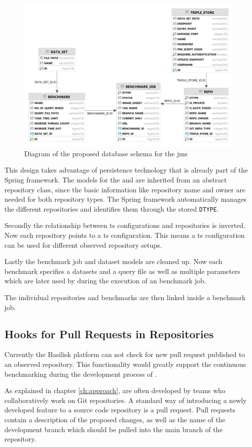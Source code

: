 \begin{figure}[tbph]
	\centering
	\includegraphics[width=.75\textwidth]{figures/jms_db_schema_design.png}
	\caption{Diagram of the proposed database schema for the \ac{jms}}
	\label{fig:design_jms_db_schema}
\end{figure}

This design takes advantage of persistence technology that is already part of the Spring framework.
The models for the \gh{} and \dockh{} are inherited from an abstract repository class, since the basic information like repository name and owner are needed for both repository types.
The Spring framework automatically manages the different repositories and identifies them through the stored \texttt{DTYPE}.

Secondly the relationship between \ac{ts} configurations and repositories is inverted. 
Now each repository points to a \ac{ts} configuration.
This means a \ac{ts} configuration can be used for different observed repository setups.

Lastly the benchmark job and dataset models are cleaned up.
Now each benchmark specifies a datasets and a query file as well as multiple parameters which are later used by \iguana{} during the execution of an benchmark job.

The individual repositories and benchmarks are then linked inside a benchmark job.


\subsection{Hooks for Pull Requests in \gh{} Repositories}
Currently the Basilisk platform can not check for new pull request published to an observed repository.
This functionality would greatly support the continuous benchmarking during the development process of \tsp{}.

As explained in chapter \ref{ch:approach}, \tsp{} are often developed by teams who collaboratively work on Git repositories.
A standard way of introducing a newly developed feature to a source code repository is a pull request.
Pull requests contain a description of the proposed changes, as well as the name of the development branch which should be pulled into the main branch of the repository.

